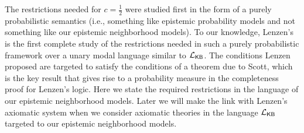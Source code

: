 \documentclass[12pt]{article}
\theoremstyle{definition}
\newcommand{\Lang}{{\cal L}}   %
\newcommand{\KB}{{\mathsf{KB}}}                 %
\begin{document}
The restrictions needed for $c=\frac 12$ were studied first in the
form of a purely probabilistic semantics (i.e., something like
epistemic probability models and not something like our epistemic
neighborhood models).  To our knowledge, Lenzen's
\cite{Lenzen1980:gwuw} is the first complete study of the restrictions
needed in such a purely probabilistic framework over a unary modal
language similar to $\Lang_\KB$. The conditions Lenzen proposed are
targeted to satisfy the conditions of a theorem due to Scott, which is
the key result that gives rise to a probability measure in the
completeness proof for Lenzen's logic.  Here we state the required
restrictions in the language of our epistemic neighborhood models.
Later we will make the link with Lenzen's axiomatic system when we
consider axiomatic theories in the language $\Lang_\KB$ targeted to
our epistemic neighborhood models.
\end{document}
